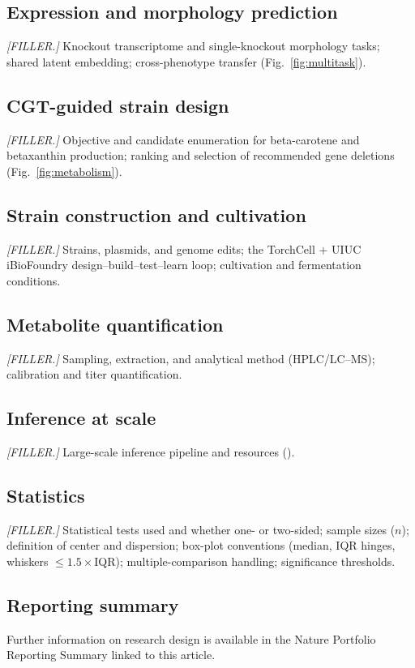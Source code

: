 \subsection*{Expression and morphology prediction}
\textit{[FILLER.]} Knockout transcriptome and single-knockout morphology tasks; shared
latent embedding; cross-phenotype transfer (Fig.~\ref{fig:multitask}).

\subsection*{CGT-guided strain design}
\textit{[FILLER.]} Objective and candidate enumeration for beta-carotene and betaxanthin
production; ranking and selection of recommended gene deletions (Fig.~\ref{fig:metabolism}).

\subsection*{Strain construction and cultivation}
\textit{[FILLER.]} Strains, plasmids, and genome edits; the TorchCell + UIUC iBioFoundry
design--build--test--learn loop; cultivation and fermentation conditions.

\subsection*{Metabolite quantification}
\textit{[FILLER.]} Sampling, extraction, and analytical method (HPLC/LC--MS); calibration
and titer quantification.

\subsection*{Inference at scale}
\textit{[FILLER.]} Large-scale inference pipeline and resources ().

\subsection*{Statistics}
\textit{[FILLER.]} Statistical tests used and whether one- or two-sided; sample sizes
($n$); definition of center and dispersion; box-plot conventions (median, IQR hinges,
whiskers $\le 1.5\times$IQR); multiple-comparison handling; significance thresholds.

\subsection*{Reporting summary}
Further information on research design is available in the Nature Portfolio Reporting
Summary linked to this article.

